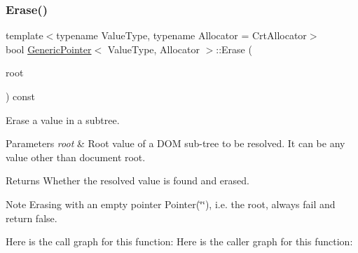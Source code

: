 \subsubsection{\texorpdfstring{Erase()}{Erase()}}
{\footnotesize\ttfamily template$<$typename Value\+Type, typename Allocator = Crt\+Allocator$>$ \\
bool \hyperlink{class_generic_pointer}{Generic\+Pointer}$<$ Value\+Type, Allocator $>$\+::Erase (\begin{DoxyParamCaption}\item[{Value\+Type \&}]{root }\end{DoxyParamCaption}) const\hspace{0.3cm}{\ttfamily [inline]}}



Erase a value in a subtree. 


\begin{DoxyParams}{Parameters}
{\em root} & Root value of a D\+OM sub-\/tree to be resolved. It can be any value other than document root. \\
\hline
\end{DoxyParams}
\begin{DoxyReturn}{Returns}
Whether the resolved value is found and erased.
\end{DoxyReturn}
\begin{DoxyNote}{Note}
Erasing with an empty pointer {\ttfamily Pointer}(\char`\"{}\char`\"{}), i.\+e. the root, always fail and return false. 
\end{DoxyNote}
Here is the call graph for this function\+:
Here is the caller graph for this function\+:
\mbox{\label{class_generic_pointer_aaf4d7d852098878d24188d134182d42f}} 
